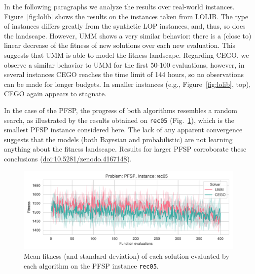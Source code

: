 \documentclass[runningheads]{llncs}
\newcommand{\supplement}{\href{http://doi.org/10.5281/zenodo.4167148}{doi:10.5281/zenodo.4167148}}
\begin{document}
In the following paragraphs we analyze the results over real-world instances. %
Figure~\ref{fig:lolib} shows the results on the instances taken from LOLIB.
The type of instances differs greatly from the synthetic LOP instances, and,
thus, so does the landscape. However, UMM shows a very similar behavior: there
is a (close to) linear decrease of the fitness of new solutions over each new
evaluation. This suggests that UMM is able to model the fitness
landscape. Regarding CEGO, we observe a similar behavior to UMM for the first
50-100 evaluations, however, in several instances CEGO reaches the time limit
of 144 hours, so no observations can be made for longer budgets. In smaller
instances (e.g., Figure~\ref{fig:lolib}, top), CEGO again appears to stagnate.
%

In the case of the PFSP, the progress of both algorithms resembles a random search, as illustrated by the results
 obtained on \texttt{rec05} (Fig.~\ref{fig:rec05}), which is the smallest PFSP
instance considered here. The lack of any apparent convergence suggests that
the models (both Bayesian and probabilistic) are not learning anything about
the fitness landscape. Results for larger PFSP corroborate these conclusions (\supplement).
  

\begin{figure}[tb]
  \centering%
  \includegraphics[width=\textwidth]{../img/fitness_real_pfsp_rec05_txt}
  \caption{Mean fitness  (and standard deviation)  of each solution evaluated by each algorithm on the PFSP instance \texttt{rec05}.\label{fig:rec05}}
\end{figure}
\end{document}

